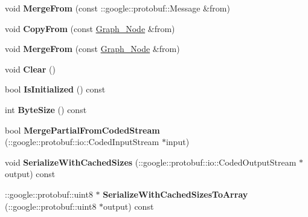 \begin{DoxyCompactItemize}
\item 
\hypertarget{classgraph_1_1Graph__Node_a4c182ee38bc9ad649a9ae67f9ba5ae18}{
void {\bfseries MergeFrom} (const ::google::protobuf::Message \&from)}
\label{classgraph_1_1Graph__Node_a4c182ee38bc9ad649a9ae67f9ba5ae18}

\item 
\hypertarget{classgraph_1_1Graph__Node_ab2ba680d4220f5c206b77aa8dafd5816}{
void {\bfseries CopyFrom} (const \hyperlink{classgraph_1_1Graph__Node}{Graph\_\-Node} \&from)}
\label{classgraph_1_1Graph__Node_ab2ba680d4220f5c206b77aa8dafd5816}

\item 
\hypertarget{classgraph_1_1Graph__Node_a979ddc18e4e1238cf396311c6622ef43}{
void {\bfseries MergeFrom} (const \hyperlink{classgraph_1_1Graph__Node}{Graph\_\-Node} \&from)}
\label{classgraph_1_1Graph__Node_a979ddc18e4e1238cf396311c6622ef43}

\item 
\hypertarget{classgraph_1_1Graph__Node_a4bddb506c7141091ad3989769a535604}{
void {\bfseries Clear} ()}
\label{classgraph_1_1Graph__Node_a4bddb506c7141091ad3989769a535604}

\item 
\hypertarget{classgraph_1_1Graph__Node_a60da720d929b8e8d5aefd410466c3871}{
bool {\bfseries IsInitialized} () const }
\label{classgraph_1_1Graph__Node_a60da720d929b8e8d5aefd410466c3871}

\item 
\hypertarget{classgraph_1_1Graph__Node_ab25a1fde48166c7639063b5750b9887b}{
int {\bfseries ByteSize} () const }
\label{classgraph_1_1Graph__Node_ab25a1fde48166c7639063b5750b9887b}

\item 
\hypertarget{classgraph_1_1Graph__Node_a3d4ce335c0bc53aa858c0e7a87a257e7}{
bool {\bfseries MergePartialFromCodedStream} (::google::protobuf::io::CodedInputStream $\ast$input)}
\label{classgraph_1_1Graph__Node_a3d4ce335c0bc53aa858c0e7a87a257e7}

\item 
\hypertarget{classgraph_1_1Graph__Node_ac36ab307cedb19991696faea055dc7e1}{
void {\bfseries SerializeWithCachedSizes} (::google::protobuf::io::CodedOutputStream $\ast$output) const }
\label{classgraph_1_1Graph__Node_ac36ab307cedb19991696faea055dc7e1}

\item 
\hypertarget{classgraph_1_1Graph__Node_a1ef9e5c555daa744d1469a0c134a636d}{
::google::protobuf::uint8 $\ast$ {\bfseries SerializeWithCachedSizesToArray} (::google::protobuf::uint8 $\ast$output) const }
\label{classgraph_1_1Graph__Node_a1ef9e5c555daa744d1469a0c134a636d}


\end{DoxyCompactItemize}
